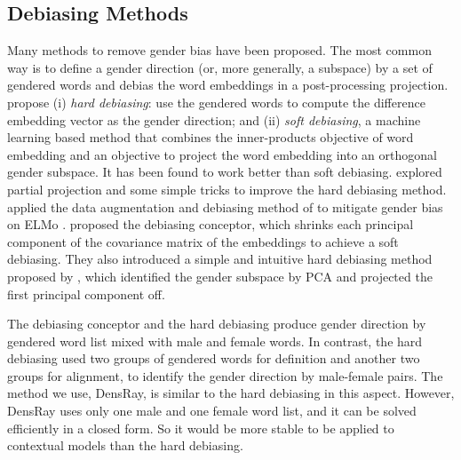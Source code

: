 \subsection{Debiasing Methods}
Many methods to remove gender bias have been proposed. The most common way is to define a gender direction (or, more generally, a subspace) by a set of gendered words and debias the word embeddings in a post-processing projection. \cite{bolukbasi2016man} propose (i) \emph{hard debiasing}: use the gendered words to compute the difference embedding vector as the gender direction; and (ii) \emph{soft debiasing}, a machine learning based method that combines the inner-products objective of word embedding and an objective to project the word embedding into an orthogonal gender subspace. It has been found to work better than soft debiasing.  \cite{dev2019attenuating} explored partial projection and some simple tricks to improve the hard debiasing method. \cite{zhao2019gender} applied the data augmentation and debiasing method of  \cite{bolukbasi2016man} to mitigate gender bias on ELMo  \cite{Peters:2018}. \cite{karve2019conceptor} proposed the debiasing conceptor, which shrinks each principal component of the covariance matrix of the embeddings to achieve a soft debiasing. They also introduced a simple and intuitive hard debiasing method proposed by \cite{mu2018all}, which identified the gender subspace by PCA and projected the first principal component off.  

The debiasing conceptor and the \cite{mu2018all} hard debiasing produce gender direction by gendered word list mixed with male and female words. In contrast, the \cite{bolukbasi2016man} hard debiasing used two groups of gendered words for definition and another two groups for alignment, to identify the gender direction by male-female pairs. The method we use, DensRay, is similar to the \cite{bolukbasi2016man} hard debiasing in this aspect. However, DensRay uses only one male and one female word list, and it can be solved efficiently in a closed form. So it would be more stable to be applied to contextual models than the \cite{bolukbasi2016man} hard debiasing. 
 



